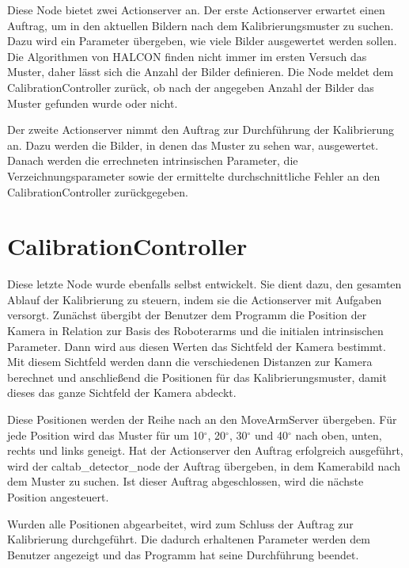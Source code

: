 Diese Node bietet zwei Actionserver an. Der erste Actionserver erwartet einen Auftrag, um in den aktuellen Bildern nach dem Kalibrierungsmuster zu suchen. Dazu wird ein Parameter übergeben, wie viele Bilder ausgewertet werden sollen. Die Algorithmen von HALCON finden nicht immer im ersten Versuch das Muster, daher lässt sich die Anzahl der Bilder definieren. Die Node meldet dem CalibrationController zurück, ob nach der angegeben Anzahl der Bilder das Muster gefunden wurde oder nicht.

Der zweite Actionserver nimmt den Auftrag zur Durchführung der Kalibrierung an. Dazu werden die Bilder, in denen das Muster zu sehen war, ausgewertet. Danach werden die errechneten intrinsischen Parameter, die Verzeichnungsparameter sowie der ermittelte durchschnittliche Fehler an den CalibrationController zurückgegeben.

\section{CalibrationController} %
\label{sec:calibrationcontroller}
Diese letzte Node wurde ebenfalls selbst entwickelt. Sie dient dazu, den gesamten Ablauf der Kalibrierung zu steuern, indem sie die Actionserver mit Aufgaben versorgt. Zunächst übergibt der Benutzer dem Programm die Position der Kamera in Relation zur Basis des Roboterarms und die initialen intrinsischen Parameter. Dann wird aus diesen Werten das Sichtfeld der Kamera bestimmt. Mit diesem Sichtfeld werden dann die verschiedenen Distanzen zur Kamera berechnet und anschließend die Positionen für das Kalibrierungsmuster, damit dieses das ganze Sichtfeld der Kamera abdeckt.

Diese Positionen werden der Reihe nach an den MoveArmServer übergeben. Für jede Position wird das Muster für um 10$^\circ$, 20$^\circ$, 30$^\circ$ und 40$^\circ$ nach oben, unten, rechts und links geneigt. Hat der Actionserver den Auftrag erfolgreich ausgeführt, wird der caltab\_detector\_node der Auftrag übergeben, in dem Kamerabild nach dem Muster zu suchen. Ist dieser Auftrag abgeschlossen, wird die nächste Position angesteuert.

Wurden alle Positionen abgearbeitet, wird zum Schluss der Auftrag zur Kalibrierung durchgeführt. Die dadurch erhaltenen Parameter werden dem Benutzer angezeigt und das Programm hat seine Durchführung beendet.